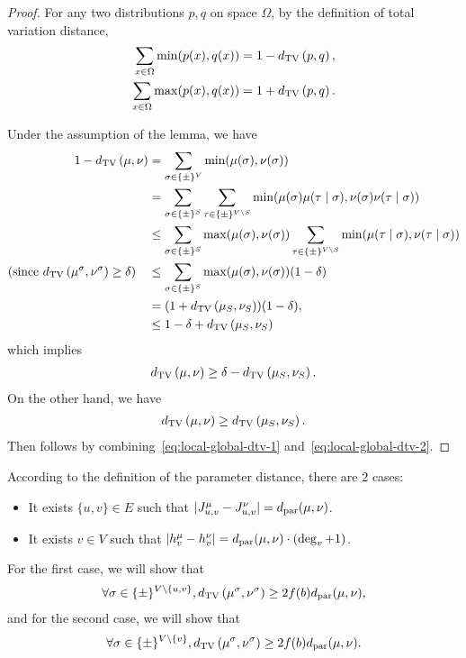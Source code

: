 \begin{proof}
For any two distributions $p,q$ on space $\Omega$, by the definition of total variation distance,
\begin{align*}
\sum_{x\in \Omega}\min(p(x),q(x)) &= 1-d_{\mathrm{TV}}\left({p},{q}\right),\\
\sum_{x\in \Omega}\max(p(x),q(x)) &= 1+d_{\mathrm{TV}}\left({p},{q}\right).
\end{align*}

Under the assumption of the lemma, we have
\begin{align*}
1-d_{\mathrm{TV}}\left({\mu},{\nu}\right)&=\sum_{\sigma\in \{\pm\}^V}\min(\mu(\sigma),\nu(\sigma))
\\
&=\sum_{\sigma\in \{\pm\}^S}\sum_{\tau\in \{\pm\}^{V\setminus S}}\min(\mu(\sigma)\mu(\tau\mid\sigma),\nu(\sigma)\nu(\tau\mid\sigma))
\\
&\leq \sum_{\sigma\in \{\pm\}^S}\max(\mu(\sigma),\nu(\sigma))\sum_{\tau\in \{\pm\}^{V\setminus S}}\min(\mu(\tau\mid\sigma),\nu(\tau\mid\sigma))
\\
(\text{since }d_{\mathrm{TV}}\left({\mu^\sigma},{\nu^\sigma}\right)\geq \delta) \quad 
&\leq \sum_{\sigma\in \{\pm\}^S}\max(\mu(\sigma),\nu(\sigma))(1-\delta) 
\\
&= (1+d_{\mathrm{TV}}\left({\mu_S},{\nu_S}\right))(1-\delta),
\\
&\leq 1-\delta+d_{\mathrm{TV}}\left({\mu_S},{\nu_S}\right)
\end{align*}    
which implies
\begin{align}
\label{eq:local-global-dtv-1}
d_{\mathrm{TV}}\left({\mu},{\nu}\right)\geq \delta - d_{\mathrm{TV}}\left({\mu_S},{\nu_S}\right).
\end{align}
On the other hand, we have 
\begin{align}
\label{eq:local-global-dtv-2}
d_{\mathrm{TV}}\left({\mu},{\nu}\right) \geq d_{\mathrm{TV}}\left({\mu_S},{\nu_S}\right).
\end{align}
Then  follows by combining~\eqref{eq:local-global-dtv-1} and~\eqref{eq:local-global-dtv-2}.
\end{proof}

According to the definition of the parameter distance, there are $2$ cases:
\begin{itemize}
\item It exists $\{u,v\}\in E$ such that $|J^\mu_{u,v}-J^\nu_{u,v}|=d_\mathrm{par}(\mu,\nu)$.
\item It exists $v\in V$ such that $|h_v^\mu-h_v^\nu|=d_\mathrm{par}(\mu,\nu) \cdot (\deg_v+1)$.
\end{itemize}

For the first case, we will show that
\begin{align}
\label{eq:Ising-dtv-lowerbound-1}
\forall \sigma \in \{\pm\}^{V\setminus\{u,v\}}, d_{\mathrm{TV}}\left({\mu^\sigma},{\nu^\sigma}\right)\geq 2f(b)d_\mathrm{par}(\mu,\nu),
\end{align}
and for the second case, we will show that
\begin{align}
\label{eq:Ising-dtv-lowerbound-2}
\forall \sigma \in \{\pm\}^{V\setminus\{v\}}, d_{\mathrm{TV}}\left({\mu^\sigma},{\nu^\sigma}\right) \geq 2f(b)d_\mathrm{par}(\mu,\nu).
\end{align}

